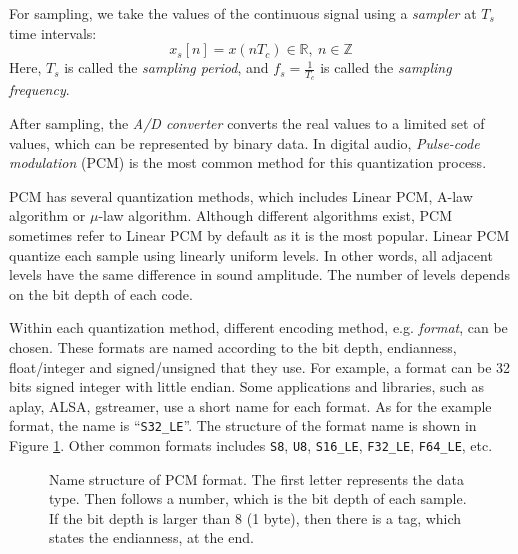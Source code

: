 \documentclass[11pt,a4paper]{report}
\begin{document}
For sampling, we take the values of the continuous signal using a \textit{sampler} at $T_s$ time intervals: \[ x_s[n] = x(n T_c) \in \mathbb{R},~ n \in \mathbb{Z} \] Here, $T_s$ is called the \textit{sampling period}, and $ f_s = \frac{1}{T_c} $ is called the \textit{sampling frequency}.

After sampling, the \textit{A/D converter} converts the real values to a limited set of values, which can be represented by binary data. In digital audio, \textit{Pulse-code modulation} (PCM) is the most common method for this quantization process. 

PCM has several quantization methods, which includes Linear PCM, A-law algorithm or $\mu$-law algorithm. Although different algorithms exist, PCM sometimes refer to Linear PCM by default as it is the most popular. Linear PCM quantize each sample using linearly uniform levels. In other words, all adjacent levels have the same difference in sound amplitude. The number of levels depends on the bit depth of each code.

Within each quantization method, different encoding method, e.g. \textit{format}, can be chosen. These formats are named according to the bit depth, endianness, float/integer and signed/unsigned that they use. For example, a format can be 32 bits signed integer with little endian. Some applications and libraries, such as aplay, ALSA, gstreamer, use a short name for each format. As for the example format, the name is ``\texttt{S32\_LE}''. The structure of the format name is shown in Figure \ref{fig:pcmname}. Other common formats includes \texttt{S8}, \texttt{U8}, \texttt{S16\_LE}, \texttt{F32\_LE}, \texttt{F64\_LE}, etc.

\begin{figure}[htpb]
\begin{center}
\end{center}
\caption[Name structure of PCM format.]{Name structure of PCM format. The first letter represents the data type. Then follows a number, which is the bit depth of each sample. If the bit depth is larger than 8 (1 byte), then there is a tag, which states the endianness, at the end.}
  \label{fig:pcmname}
\end{figure}
\end{document}
